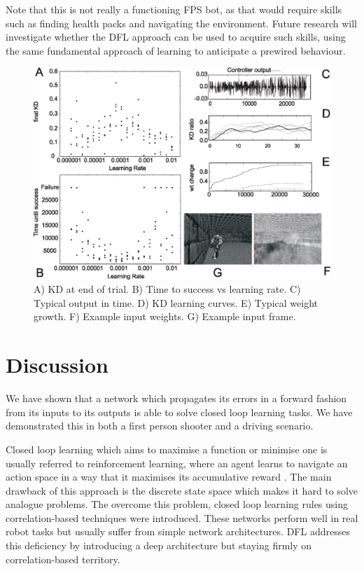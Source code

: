 \documentclass{llncs}
\begin{document}
Note that this is not really a functioning FPS bot, as that would require skills such as finding health packs and navigating the environment. Future research will investigate whether the DFL approach can be used to acquire such skills, using the same fundamental approach of learning to anticipate a prewired behaviour. 


\begin{figure}[h!]
	\centering
	\includegraphics[width=\columnwidth]{FPSFig7}
	\caption{A) KD at end of trial. B) Time to success vs learning rate. C) Typical output in time. D) KD learning curves. E) Typical weight growth. F) Example input weights. G) Example input frame.
		\label{shooter_results}}
\end{figure}

\section{Discussion}
We have shown that a network which propagates its errors in a forward
fashion from its inputs to its outputs is able to solve closed loop
learning tasks. We have demonstrated this in both a first person
shooter and a driving scenario.

Closed loop learning which aims to maximise a function or minimise one
is usually referred to reinforcement learning, where an agent learns to
navigate an action space in a way that it maximises its accumulative
reward \cite{Dayan1992}. The main drawback of this approach
is the discrete state space which makes it hard to solve analogue
problems. The overcome this problem, closed loop learning rules using
correlation-based techniques \cite{Verschure98summary} were introduced.
These networks perform well in real robot tasks but usually suffer from
simple network architectures. DFL addresses this
deficiency by introducing a deep architecture but staying firmly
on correlation-based territory.
\end{document}

